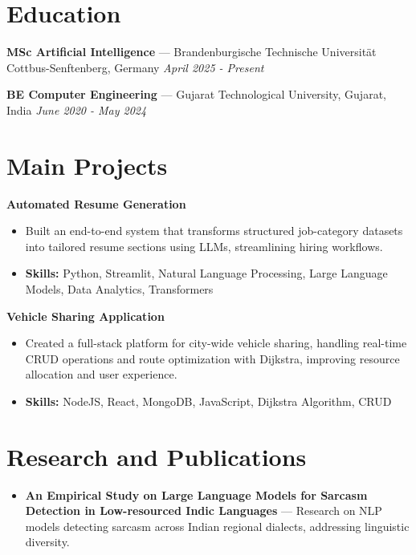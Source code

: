 \documentclass[a4paper,10pt]{article}
\begin{document}
\section*{Education}
\textbf{MSc Artificial Intelligence} — Brandenburgische Technische Universität Cottbus-Senftenberg, Germany \hfill \textit{April 2025 - Present}\par
\vspace{1.5pt}
\textbf{BE Computer Engineering} — Gujarat Technological University, Gujarat, India \hfill \textit{June 2020 - May 2024}\par

\section*{Main Projects}
\textbf{Automated Resume Generation}\par
\vspace{1pt}
\begin{itemize}
  \item Built an end-to-end system that transforms structured job-category datasets into tailored resume sections using LLMs, streamlining hiring workflows.
  \item \textbf{Skills:} Python, Streamlit, Natural Language Processing, Large Language Models, Data Analytics, Transformers
\end{itemize}
\vspace{3pt}
\textbf{Vehicle Sharing Application}\par
\vspace{1pt}
\begin{itemize}
  \item Created a full-stack platform for city-wide vehicle sharing, handling real-time CRUD operations and route optimization with Dijkstra, improving resource allocation and user experience.
  \item \textbf{Skills:} NodeJS, React, MongoDB, JavaScript, Dijkstra Algorithm, CRUD
\end{itemize}

\section*{Research and Publications}
\begin{itemize}
\item \textbf{An Empirical Study on Large Language Models for Sarcasm Detection in Low-resourced Indic Languages} — Research on NLP models detecting sarcasm across Indian regional dialects, addressing linguistic diversity.
\end{itemize}
\end{document}
